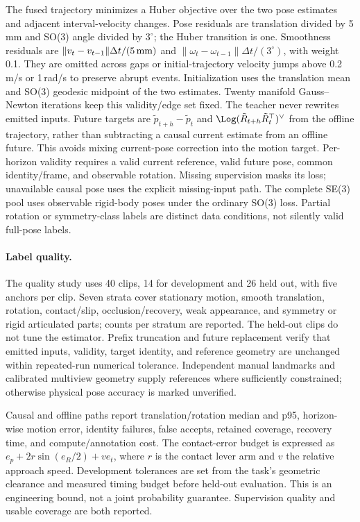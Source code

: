 The fused trajectory minimizes a Huber objective over the two pose estimates
and adjacent interval-velocity changes. Pose residuals are translation
divided by 5\,mm and SO(3) angle divided by $3^\circ$; the Huber transition
is one. Smoothness residuals are
$\|v_t-v_{t-1}\|\Delta t/(5\,{\rm mm})$ and
$\|\omega_t-\omega_{t-1}\|\Delta t/(3^\circ)$, with weight 0.1.
They are omitted across gaps or initial-trajectory velocity jumps above
0.2\,m/s or 1\,rad/s to preserve abrupt events. Initialization uses the
translation mean and SO(3) geodesic midpoint of the two estimates.
Twenty manifold Gauss--Newton iterations keep this validity/edge set fixed.
The teacher never rewrites emitted inputs. Future targets are
$\tilde p_{t+h}-\tilde p_t$ and
$\Log(\tilde R_{t+h}\tilde R_t^\top)^\vee$ from the offline trajectory,
rather than subtracting a causal current estimate from an offline future.
This avoids mixing current-pose correction into the motion target.
Per-horizon validity requires a valid current reference, valid future pose,
common identity/frame, and observable rotation. Missing supervision masks
its loss; unavailable causal pose uses the explicit missing-input path.
The complete SE(3) pool uses observable rigid-body poses under the ordinary
SO(3) loss. Partial rotation or symmetry-class labels are distinct data
conditions, not silently valid full-pose labels.

\paragraph{Label quality.}
The quality study uses 40 clips, 14 for development and 26 held out, with
five anchors per clip. Seven strata cover stationary motion, smooth
translation, rotation, contact/slip, occlusion/recovery, weak appearance,
and symmetry or rigid articulated parts; counts per stratum are reported.
The held-out clips do not tune the estimator. Prefix truncation and
future replacement verify that emitted inputs, validity, target identity,
and reference geometry are unchanged within repeated-run numerical
tolerance. Independent manual landmarks and calibrated multiview geometry
supply references where sufficiently constrained; otherwise physical pose
accuracy is marked unverified.

Causal and offline paths report translation/rotation median and p95,
horizon-wise motion error, identity failures, false accepts, retained
coverage, recovery time, and compute/annotation cost. The contact-error
budget is expressed as
$e_p+2r\sin(e_R/2)+v e_t$, where $r$ is the contact lever arm and $v$ the
relative approach speed. Development tolerances are set from the task's
geometric clearance and measured timing budget before held-out evaluation.
This is an engineering bound, not a joint probability guarantee.
Supervision quality and usable coverage are both reported.

